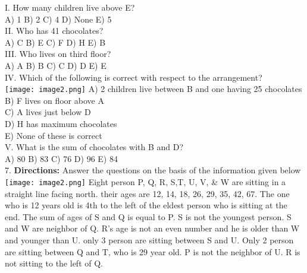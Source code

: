 \documentclass[
]{article}
\begin{document}
I. How many children live above E?\\
A) 1 \hspace{2mm}B) 2 \hspace{2mm}C) 4 \hspace{2mm}D) None \hspace{2mm}E) 5\\

II. Who has 41 chocolates?\\
A) C \hspace{2mm}B) E \hspace{2mm}C) F \hspace{2mm}D) H \hspace{2mm}E) B\\

III. Who lives on third floor?\\
A) A \hspace{2mm}B) B \hspace{2mm}C) C \hspace{2mm}D) D \hspace{2mm}E) E\\

IV. Which of the following is correct with respect to the arrangement?\\
\texttt{[image: image2.png]}
A) 2 children live between B and one having 25 chocolates\\
B) F lives on floor above A\\
C) A lives just below D\\
D) H has maximum chocolates\\
E) None of these is correct\\

V. What is the sum of chocolates with B and D?\\
A) 80 \hspace{2mm}B) 83 \hspace{2mm}C) 76 \hspace{2mm}D) 96 \hspace{2mm}E) 84\\

7. \textbf{Directions:} Answer the questions on the basis of the information given below\\
\texttt{[image: image2.png]}
Eight person P, Q, R, S,T, U, V, & W are sitting in a straight line facing north. their ages are
12, 14, 18, 26, 29, 35, 42, 67. The one who is 12 years old is 4th to the left of the eldest person
who is sitting at the end. The sum of ages of S and Q is equal to P. S is not the youngest
person. S and W are neighbor of Q. R's age is not an even number and he is older than W
and younger than U. only 3 person are sitting between S and U. Only 2 person are sitting
between Q and T, who is 29 year old. P is not the neighbor of U. R is not sitting to the left of
Q.\\
\end{document}
